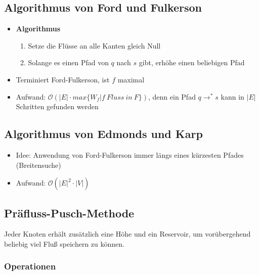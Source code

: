 \subsection{Algorithmus von Ford und Fulkerson}
\begin{itemize}
	\item \textbf{Algorithmus}
	\begin{enumerate}
		\item Setze die Flüsse an alle Kanten gleich Null
		\item Solange es einen Pfad von \(q\) nach \(s\) gibt, erhöhe einen beliebigen Pfad
	\end{enumerate}
	\item Terminiert Ford-Fulkerson, ist \(f\) maximal
	\item Aufwand: \(\mathcal{O}(|E| \cdot max\{W_f | f~Fluss~in~F\})\), denn ein Pfad \(q \rightarrow^{*} s\) kann in \(|E|\) Schritten gefunden werden
\end{itemize}


\subsection{Algorithmus von Edmonds und Karp}
\begin{itemize}
	\item Idee: Anwendung von Ford-Fulkerson immer längs eines kürzesten Pfades (Breitensuche)
	\item Aufwand: \(\mathcal{O} (|E|^2 \cdot |V|)\)
\end{itemize}


\subsection{Präfluss-Pusch-Methode}
Jeder Knoten erhält zusätzlich eine Höhe und ein Reservoir, um vorübergehend beliebig viel Fluß speichern zu können.

\subsubsection{Operationen}


